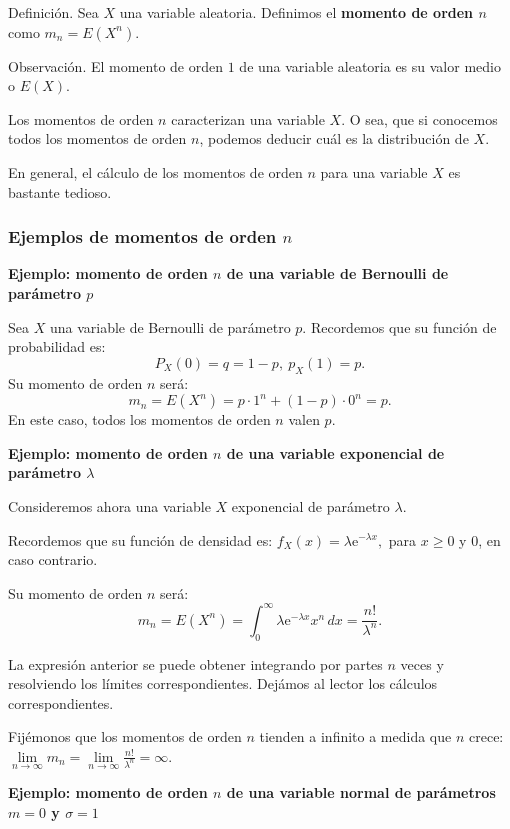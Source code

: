 \documentclass[]{book}
\begin{document}
 Definición.
Sea \(X\) una variable aleatoria. Definimos el \textbf{momento de orden \(n\)} como
\(m_n = E\left(X^n\right)\).

 Observación.
El momento de orden \(1\) de una variable aleatoria es su valor medio o \(E(X)\).

Los momentos de orden \(n\) caracterizan una variable \(X\). O sea, que si conocemos todos los momentos de orden \(n\), podemos deducir cuál es la distribución de \(X\).

En general, el cálculo de los momentos de orden \(n\) para una variable \(X\) es bastante tedioso.

\hypertarget{ejemplos-de-momentos-de-orden-n}{%
\subsubsection{\texorpdfstring{Ejemplos de momentos de orden \(n\)}{Ejemplos de momentos de orden n}}\label{ejemplos-de-momentos-de-orden-n}}

\textbf{Ejemplo: momento de orden \(n\) de una variable de Bernoulli de parámetro \(p\)}

Sea \(X\) una variable de Bernoulli de parámetro \(p\). Recordemos que su función de probabilidad es:
\[
P_X(0)=q=1-p,\ p_X(1)=p.
\]
Su momento de orden \(n\) será:
\[
m_n = E\left(X^n\right)=p\cdot 1^n+(1-p)\cdot 0^n = p.
\]
En este caso, todos los momentos de orden \(n\) valen \(p\).

\textbf{Ejemplo: momento de orden \(n\) de una variable exponencial de parámetro \(\lambda\)}

Consideremos ahora una variable \(X\) exponencial de parámetro \(\lambda\).

Recordemos que su función de densidad es: \(f_X(x)=\lambda \mathrm{e}^{-\lambda x},\) para \(x\geq 0\) y \(0\), en caso contrario.

Su momento de orden \(n\) será:
\[
m_n = E\left(X^n\right)=\int_0^\infty \lambda \mathrm{e}^{-\lambda x} x^n\, dx =\frac{n!}{\lambda^n}.
\]

La expresión anterior se puede obtener integrando por partes \(n\) veces y resolviendo los límites correspondientes. Dejámos al lector los cálculos correspondientes.

Fijémonos que los momentos de orden \(n\) tienden a infinito a medida que \(n\) crece: \(\lim\limits_{n\to\infty}m_n = \lim\limits_{n\to\infty}\frac{n!}{\lambda^n}=\infty\).

\textbf{Ejemplo: momento de orden \(n\) de una variable normal de parámetros \(m=0\) y \(\sigma =1\)}
\end{document}

